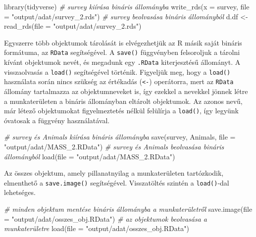 \documentclass[
]{book}
\newenvironment{Shaded}{\begin{snugshade}}{\end{snugshade}}
\newcommand{\AttributeTok}[1]{\textcolor[rgb]{0.77,0.63,0.00}{#1}}
\newcommand{\CommentTok}[1]{\textcolor[rgb]{0.56,0.35,0.01}{\textit{#1}}}
\newcommand{\FunctionTok}[1]{\textcolor[rgb]{0.00,0.00,0.00}{#1}}
\newcommand{\NormalTok}[1]{#1}
\newcommand{\OtherTok}[1]{\textcolor[rgb]{0.56,0.35,0.01}{#1}}
\newcommand{\StringTok}[1]{\textcolor[rgb]{0.31,0.60,0.02}{#1}}
\begin{document}
\begin{Shaded}
\begin{Highlighting}[]
\FunctionTok{library}\NormalTok{(tidyverse)}
\CommentTok{\# survey kiírása bináris állományba}
\FunctionTok{write\_rds}\NormalTok{(}\AttributeTok{x =}\NormalTok{ survey, }\AttributeTok{file =} \StringTok{"output/adat/survey\_2.rds"}\NormalTok{)}
\CommentTok{\# survey beolvasása bináris állományból}
\NormalTok{d.df }\OtherTok{\textless{}{-}} \FunctionTok{read\_rds}\NormalTok{(}\AttributeTok{file =} \StringTok{"output/adat/survey\_2.rds"}\NormalTok{)}
\end{Highlighting}
\end{Shaded}

Egyszerre több objektumok tárolását is elvégezhetjük az R másik saját bináris formátuma, az \texttt{RData} segítségével. A \texttt{save()} függvényben felsoroljuk a tárolni kívánt objektumok nevét, és megadunk egy \texttt{.RData} kiterjesztésű állományt. A visszaolvasás a \texttt{load()} segítségével történik. Figyeljük meg, hogy a \texttt{load()} használata során nincs szükség az értékadás (\texttt{\textless{}-}) operátorra, mert az \texttt{RData} állomány tartalmazza az objektumneveket is, így ezekkel a nevekkel jönnek létre a munkaterületen a bináris állományban eltárolt objektumok. Az azonos nevű, már létező objektumokat figyelmeztetés nélkül felülírja a \texttt{load()}, így legyünk óvatosak a függvény használatával.

\begin{Shaded}
\begin{Highlighting}[]
\CommentTok{\# survey és Animals kiírása bináris állományba}
\FunctionTok{save}\NormalTok{(survey, Animals, }\AttributeTok{file =} \StringTok{"output/adat/MASS\_2.RData"}\NormalTok{)}
\CommentTok{\# survey és Animals beolvasása bináris állományból}
\FunctionTok{load}\NormalTok{(}\AttributeTok{file =} \StringTok{"output/adat/MASS\_2.RData"}\NormalTok{)}
\end{Highlighting}
\end{Shaded}

Az összes objektum, amely pillanatnyilag a munkaterületen tartózkodik, elmenthető a \texttt{save.image()} segítségével. Visszatöltés szintén a \texttt{load()}-dal lehetséges.

\begin{Shaded}
\begin{Highlighting}[]
\CommentTok{\# minden objektum mentése bináris állományba a munkaterületről}
\FunctionTok{save.image}\NormalTok{(}\AttributeTok{file =} \StringTok{"output/adat/osszes\_obj.RData"}\NormalTok{)}
\CommentTok{\# az objektumok beolvasása a munkaterületre}
\FunctionTok{load}\NormalTok{(}\AttributeTok{file =} \StringTok{"output/adat/osszes\_obj.RData"}\NormalTok{)}
\end{Highlighting}
\end{Shaded}
\end{document}
